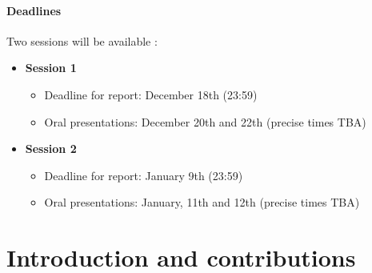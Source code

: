 \documentclass[11pt]{article}
\begin{document}
\paragraph{Deadlines}
Two sessions will be available :
\begin{itemize}
 \item \textbf{Session 1}
 \begin{itemize}
  \item Deadline for report: December 18th (23:59)
  \item Oral presentations: December 20th and 22th (precise times TBA)
 \end{itemize}
\item \textbf{Session 2}
 \begin{itemize}
  \item Deadline for report: January 9th (23:59)
  \item Oral presentations: January, 11th and 12th (precise times TBA)
 \end{itemize}
\end{itemize}

\section{Introduction and contributions}
\end{document}
